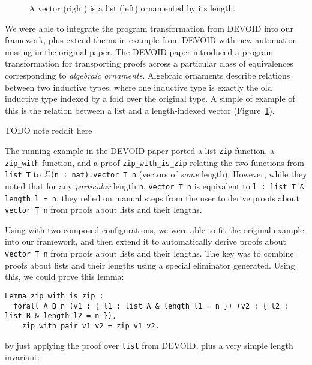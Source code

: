 \begin{figure}
\begin{minipage}{0.40\textwidth}
   
\end{minipage}
\hfill
\begin{minipage}{0.58\textwidth}
   
\end{minipage}
\caption{A vector (right) is a list (left) ornamented by its length.}
\label{fig:listtovect}
\end{figure}

We were able to integrate the program transformation from DEVOID into our framework, plus extend
the main example from DEVOID with new automation missing in the original paper.
The DEVOID paper introduced a program transformation for transporting proofs across a particular class
of equivalences corresponding to \textit{algebraic ornaments}. Algebraic ornaments describe relations
between two inductive types, where one inductive type is exactly the old inductive type indexed by a fold
over the original type.
A simple of example of this is the relation between a list and a length-indexed vector (Figure~\ref{fig:listtovect}).



TODO note reddit here

The running example in the DEVOID paper ported a list \lstinline{zip} function,
a \lstinline{zip_with} function, and a proof \lstinline{zip_with_is_zip} relating the two
functions from \lstinline{list T} to $\Sigma$\lstinline{(n : nat).vector T n} (vectors of
\textit{some} length).
However, while they noted that for any \textit{particular} length \lstinline{n}, \lstinline{vector T n} is equivalent to
\lstinline{l : list T & length l = n}, they relied on manual steps from the user to derive proofs about \lstinline{vector T n}
from proofs about lists and their lengths.

Using \toolname with two composed configurations, we were able to fit the original example into our framework,
and then extend it to automatically derive proofs about \lstinline{vector T n} from proofs about lists and their lengths.
The key was to combine proofs about lists and their lengths using a special eliminator \toolname generated.
Using this, we could prove this lemma:

\begin{lstlisting}
Lemma zip_with_is_zip :
  forall A B n (v1 : { l1 : list A & length l1 = n }) (v2 : { l2 : list B & length l2 = n }),
    zip_with pair v1 v2 = zip v1 v2.
\end{lstlisting}
by just applying the proof over \lstinline{list} from DEVOID, plus a very simple length invariant:

